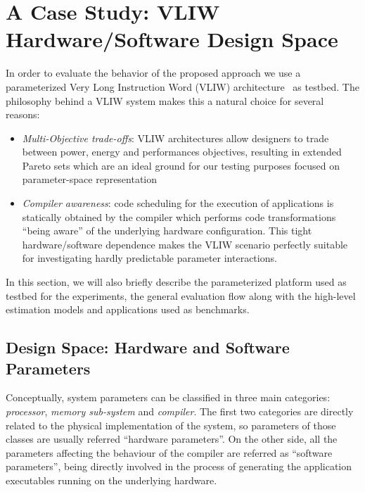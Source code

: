 \section{A Case Study: VLIW Hardware/Software Design Space}
In order to evaluate the behavior of the proposed approach
we use a parameterized Very Long Instruction
Word (VLIW) architecture~\cite{kathail_tr00} as testbed. The philosophy
behind a VLIW system makes this a natural choice for several reasons:
\begin{itemize}
\item \emph{Multi-Objective trade-offs}: VLIW architectures allow designers
to trade between power, energy and performances objectives, resulting
in extended Pareto sets which are an ideal ground for our testing
purposes focused on parameter-space representation
\item \emph{Compiler awareness}: code scheduling for the execution of
applications is statically obtained by the compiler which
performs code transformations ``being aware'' of the underlying hardware
configuration.  This tight hardware/software dependence makes the
VLIW scenario perfectly suitable for investigating hardly predictable
parameter interactions.
\end{itemize}

In this section, we will also briefly describe the parameterized platform used
as testbed for the experiments, the general evaluation flow along with
the high-level estimation models and applications used as benchmarks.

\subsection{Design Space: Hardware and Software Parameters}
Conceptually, system parameters can be classified in three main categories:
\emph{processor}, \emph{memory sub-system} and \emph{compiler}. The
first two categories are directly related to the physical
implementation of the system, so parameters of those
classes are usually referred ``hardware parameters''. On the other
side, all the parameters affecting the behaviour of the compiler
are referred as ``software parameters'', being directly involved in
the process of generating the application executables running on the
underlying hardware.

